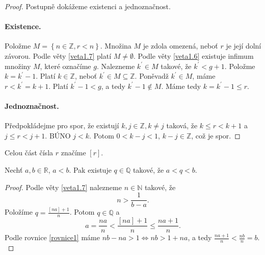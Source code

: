 \begin{proof} Postupně dokážeme existenci a jednoznačnost.
	\paragraph{Existence.} Položme $M=\left \{ n\in \mathbb Z , r < n \right \} $. Množina $M$ je zdola omezená, neboť $r$ je její
	dolní závorou. Podle věty \ref{veta1.7} platí $M\ne \emptyset$. Podle věty \ref{veta1.6} existuje infimum
	množiny $M$, které označíme $g$. Nalezneme $k^\prime\in M$ takové, že $k^\prime<g+1$. Položme $k=k^\prime - 1$.
	Platí $k\in \mathbb Z $, neboť $k^\prime \in M\subseteq \mathbb Z $. Poněvadž $k^\prime \in M$, máme
	$r<k^\prime = k+1$. Platí $k^\prime - 1 < g$, a tedy $k^\prime - 1 \notin M$. Máme tedy $k=k^\prime - 1\leq r$.
	\paragraph{Jednoznačnost.} Předpokládejme pro spor, že existují $k,j \in \mathbb Z , k\ne j$ taková, že
	$k\leq r < k+1$ a $j\leq r<j+1$. BÚNO $j<k$. Potom $0<k-j<1$, $k-j \in \mathbb Z $, což je spor.
\end{proof}

\begin{oznaceni}
	Celou část čísla $r$ značíme $\left [ r \right ] $.
\end{oznaceni}

\begin{veta}\label{veta1.9}
	Nechť $a,b\in \mathbb R$, $a<b$. Pak existuje $q \in \mathbb Q $ takové, že $a<q<b$.
\end{veta}

\begin{proof}
	Podle věty \ref{veta1.7} nalezneme $n\in \mathbb N $ takové, že
	\begin{equation}\label{rovnice1}
	n> \frac{1}{b-a}.
	\end{equation}
    Položíme $q=\frac{[na]+1}{n}$. Potom $q\in \mathbb Q $ a $$a=\frac{na}{n}<\frac{[na]+1}{n}\leq \frac{na+1}{n}.$$ Podle
    rovnice \ref{rovnice1} máme $nb-na > 1 \iff nb>1+na$, a tedy $\frac{na+1}{n}<\frac{nb}{n}=b.$
\end{proof}

